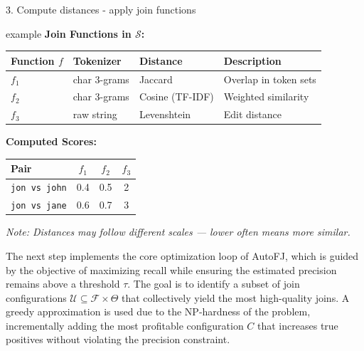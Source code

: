 \documentclass[8pt]{beamer} %
\begin{document}
\begin{frame}{3. Compute distances - apply join functions}
\begin{beamercolorbox}[rounded=true, shadow=true, leftskip=1em, rightskip=1em]{example}
		\vspace{0.5em}
		\textbf{Join Functions in $\mathcal{S}$:}
		\begin{tabular}{llll}
			\textbf{Function $f$} & \textbf{Tokenizer} & \textbf{Distance} & \textbf{Description} \\
			\hline
			$f_1$ & char 3-grams & Jaccard & Overlap in token sets \\
			$f_2$ & char 3-grams & Cosine (TF-IDF) & Weighted similarity \\
			$f_3$ & raw string   & Levenshtein & Edit distance \\
		\end{tabular}
		
		\vspace{0.5em}
		\textbf{Computed Scores:}
		\begin{tabular}{lccc}
			\textbf{Pair} & $f_1$ & $f_2$ & $f_3$ \\
			\hline
			\texttt{jon vs john} & 0.4 & 0.5 & 2 \\
			\texttt{jon vs jane} & 0.6 & 0.7 & 3 \\
		\end{tabular}
		
		\vspace{0.5em}
		\textit{Note: Distances may follow different scales — lower often means more similar.}
	\end{beamercolorbox}
\end{frame}


\begin{frame}
	The next step implements the core optimization loop of AutoFJ, which is guided by the objective of maximizing recall while ensuring the estimated precision remains above a threshold $\tau$. The goal is to identify a subset of join configurations $\mathcal{U} \subseteq \mathcal{F} \times \Theta$ that collectively yield the most high-quality joins. A greedy approximation is used due to the NP-hardness of the problem, incrementally adding the most profitable configuration $C$ that increases true positives without violating the precision constraint.
	
\end{frame}
\end{document}
